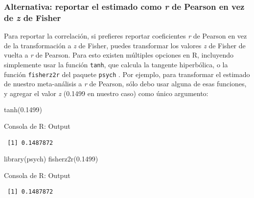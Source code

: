 \documentclass[
  bookmarksnumbered]{article}
\newenvironment{Shaded}{\begin{snugshade}}{\end{snugshade}}
\newcommand{\FloatTok}[1]{\textcolor[rgb]{0.69,0.50,0.00}{#1}}
\newcommand{\FunctionTok}[1]{\textcolor[rgb]{0.39,0.29,0.61}{#1}}
\newcommand{\NormalTok}[1]{\textcolor[rgb]{0.12,0.11,0.11}{#1}}
\begin{document}
\hypertarget{alternativa-reportar-el-estimado-como-r-de-pearson-en-vez-de-z-de-fisher}{%
\subsubsection{\texorpdfstring{Alternativa: reportar el estimado como \emph{r} de Pearson en vez de \emph{z} de Fisher}{Alternativa: reportar el estimado como r de Pearson en vez de z de Fisher}}\label{alternativa-reportar-el-estimado-como-r-de-pearson-en-vez-de-z-de-fisher}}

Para reportar la correlación, si prefieres reportar coeficientes \emph{r} de Pearson en vez de la transformación a \emph{z} de Fisher, puedes transformar los valores \emph{z} de Fisher de vuelta a \emph{r} de Pearson. Para esto existen múltiples opciones en R, incluyendo simplemente usar la función \texttt{tanh}, que calcula la tangente hiperbólica, o la función \texttt{fisherz2r} del paquete \texttt{psych} \autocite{revellePsych2021}. Por ejemplo, para transformar el estimado de nuestro meta-análisis a \emph{r} de Pearson, sólo debo usar alguna de esas funciones, y agregar el valor \emph{z} (0.1499 en nuestro caso) como único argumento:

\begin{Shaded}
\begin{Highlighting}[]
\FunctionTok{tanh}\NormalTok{(}\FloatTok{0.1499}\NormalTok{)}
\end{Highlighting}
\end{Shaded}

\begin{ROut}{Consola de R: Output~\thetcbcounter}
                \begin{footnotesize}
                \begin{verbatim} [1] 0.1487872
 \end{verbatim}
                \end{footnotesize}
                \end{ROut}

\begin{Shaded}
\begin{Highlighting}[]
\FunctionTok{library}\NormalTok{(psych)}
\FunctionTok{fisherz2r}\NormalTok{(}\FloatTok{0.1499}\NormalTok{)}
\end{Highlighting}
\end{Shaded}

\begin{ROut}{Consola de R: Output~\thetcbcounter}
                \begin{footnotesize}
                \begin{verbatim} [1] 0.1487872
 \end{verbatim}
                \end{footnotesize}
                \end{ROut}
\end{document}

